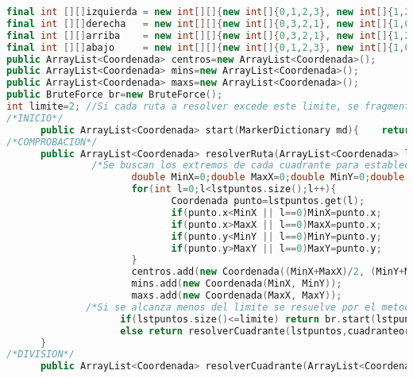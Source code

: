 \begin{lstlisting}[language=C++, caption=Algoritmo Base del Método de Cuadrantes, label=lst:codigo11,escapechar=|]
final int [][]izquierda = new int[][]{new int[]{0,1,2,3}, new int[]{1,2,3,0}, new int[]{2,1,0,3}, new int[]{3,2,1,0},}; 
final int [][]derecha   = new int[][]{new int[]{0,3,2,1}, new int[]{1,0,3,2}, new int[]{2,3,0,1}, new int[]{3,0,1,2},}; 
final int [][]arriba    = new int[][]{new int[]{0,3,2,1}, new int[]{1,2,3,0}, new int[]{2,3,0,1}, new int[]{3,2,1,0},};    
final int [][]abajo     = new int[][]{new int[]{0,1,2,3}, new int[]{1,0,3,2}, new int[]{2,1,0,3}, new int[]{3,0,1,2},};
public ArrayList<Coordenada> centros=new ArrayList<Coordenada>();
public ArrayList<Coordenada> mins=new ArrayList<Coordenada>();     
public ArrayList<Coordenada> maxs=new ArrayList<Coordenada>();
public BruteForce br=new BruteForce();
int limite=2; //Si cada ruta a resolver excede este limite, se fragmentara por cuadrantes 
/*INICIO*/    
      public ArrayList<Coordenada> start(MarkerDictionary md){    return resolverRuta(md.marcadores,md.marcadores.get(0),-1,-1);    }
/*COMPROBACION*/ 
      public ArrayList<Coordenada> resolverRuta(ArrayList<Coordenada> lstpuntos,Coordenada destino,int cuadranteorigen, int cuadrantedestino){
               /*Se buscan los extremos de cada cuadrante para establecer un punto centro, esto es en caso de que se necesite volver a defragmentar de nuevo el cuadrante*/
                      double MinX=0;double MaxX=0;double MinY=0;double MaxY=0;               
                      for(int l=0;l<lstpuntos.size();l++){
                             Coordenada punto=lstpuntos.get(l);
                             if(punto.x<MinX || l==0)MinX=punto.x;
                             if(punto.x>MaxX || l==0)MaxX=punto.x;
                             if(punto.y<MinY || l==0)MinY=punto.y;
                             if(punto.y>MaxY || l==0)MaxY=punto.y; 
                      }
                      centros.add(new Coordenada((MinX+MaxX)/2, (MinY+MaxY)/2));
                      mins.add(new Coordenada(MinX, MinY));
                      maxs.add(new Coordenada(MaxX, MaxY));      
              /*Si se alcanza menos del limite se resuelve por el metodo de fuerza bruta, si no se fragmentara de manera infinita hasta satisfacer el limite*/
                    if(lstpuntos.size()<=limite) return br.start(lstpuntos,destino);
                    else return resolverCuadrante(lstpuntos,cuadranteorigen,cuadrantedestino);
      }
/*DIVISION*/     
      public ArrayList<Coordenada> resolverCuadrante(ArrayList<Coordenada> lstpuntos,int cuadranteorigen, int cuadrantedestino){

\end{lstlisting}
